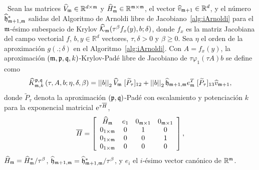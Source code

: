\begin{definition}\label{def:gen_kp_aprox_fj}
	\cite{naranjo2023jacobian}~Sean las matrices $\widehat{V}_{\mathfrak{m}}\in\mathbb{R}^{d\times \mathfrak{m}}$ y $\widehat{H}^*_{\mathfrak{m}}\in\mathbb{R}^{{\mathfrak{m}} \times {\mathfrak{m}}}$, el vector $\widehat{v}_{\mathfrak{m}+1}\in\mathbb{R}^d$, y el número  $ \widehat{\mathfrak{h}}^*_{\mathfrak{m}+1,\mathfrak{m}}$ salidas del Algoritmo de Arnoldi libre de Jacobiano~\ref{alg:iArnoldi} para el $\mathfrak{m}$-ésimo subespacio de Krylov $\widehat{\mathcal{K}}_{\mathfrak{m}}(\tau^\beta f_x(y),b;\delta)$, donde $f_x$ es la matriz Jacobiana del campo vectorial $f$, $b,y\in\mathbb{R}^d$ vectores, $\tau,\delta>0$ y $\beta \ge 0$. Sea $\eta$ el orden de la aproximación $g(.;\delta)$ en el Algoritmo~\ref{alg:iArnoldi}. Con $A=f_x(y)$, la aproximación $(\mathfrak{m} , \mathfrak{p} ,\mathfrak{q} , k)$-Krylov-Padé libre de Jacobiano de $\tau \varphi_1(\tau A)b$ se define como
	\begin{equation} \label{eq:gen_kp_aprox_fj}
		\widehat{K}_{\mathfrak{m},k}^{\mathfrak{p},\mathfrak{q}}\left(\tau, A , b ; \eta, \delta, \beta \right)=\left\lvert \left\lvert b \right\rvert \right\rvert_2 \widehat{V}_{\mathfrak{m}}\;[\widetilde{P}_{\tau}]_{12} + \left\lvert \left\lvert b \right\rvert \right\rvert_2 \widehat{\mathfrak{h}}_{\mathfrak{m}+1,\mathfrak{m}}e_{\mathfrak{m}}^T\;[\widetilde{P}_{\tau}]_{13} \widehat{v}_{\mathfrak{m}+1},
	\end{equation}
	donde $\widetilde{P}_{\tau}$ denota la aproximación $(\mathfrak{p},\mathfrak{q})$-Padé con escalamiento y potenciación $k$ para la exponencial matricial $\mathrm{e}^{\tau\overline{H}}$,
	\begin{equation}
		\overline{H} = \left[\begin{array}{cccc}
			\widehat{H}_{\mathfrak{m}} & e_1 & 0_{\mathfrak{m}\times 1} & 0_{\mathfrak{m}\times 1}\\
			0_{1\times\mathfrak{m}} & 0 & 1 & 0\\
			0_{1\times\mathfrak{m}} & 0 & 0 & 1\\
			0_{1\times\mathfrak{m}} & 0 & 0 & 0
		\end{array}\right],
	\end{equation}
	$\widehat{H}_{\mathfrak{m}}=\widehat{H}^*_{\mathfrak{m}}/\tau^\beta$, $\widehat{\mathfrak{h}}_{\mathfrak{m}+1,\mathfrak{m}}=\widehat{\mathfrak{h}}^*_{\mathfrak{m}+1,\mathfrak{m}}/\tau^\beta$, y $e_i$ el $i$-ésimo vector canónico de $\mathbb{R}^{\mathfrak{m}}$.
\end{definition}


